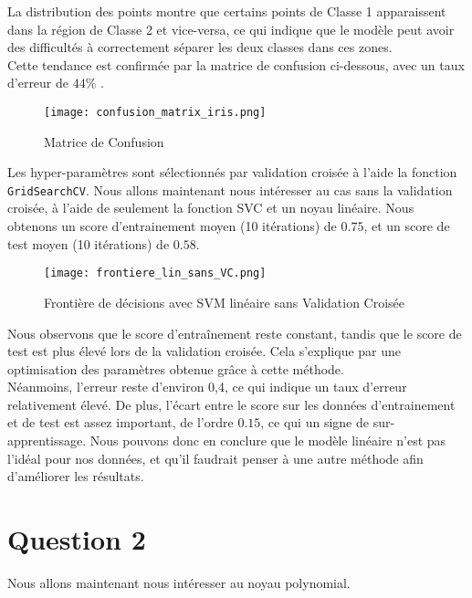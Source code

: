 \documentclass{article}
\begin{document}
La distribution des points montre que certains points de Classe 1 apparaissent dans la région de Classe 2 et vice-versa, ce qui indique que le modèle peut avoir des difficultés à correctement séparer les deux classes dans ces zones.\\


Cette tendance est confirmée par la matrice de confusion ci-dessous, avec un taux d'erreur de $44 \%$ .

\begin{figure}[H]
    \centering
    \texttt{[image: confusion\_matrix\_iris.png]}
    \caption{Matrice de Confusion}
    \label{fig:enter-label}
\end{figure}

Les hyper-paramètres sont sélectionnés par validation croisée à l'aide la fonction \texttt{GridSearchCV}. Nous allons maintenant nous intéresser au cas sans la validation croisée, à l’aide de seulement la fonction SVC et un noyau linéaire. Nous obtenons un score d'entrainement moyen (10 itérations) de $0.75$, et un score de test moyen (10 itérations) de $0.58$.


\begin{figure}[H]
    \centering
    \texttt{[image: frontiere\_lin\_sans\_VC.png]}
    \caption{Frontière de décisions avec SVM linéaire sans Validation Croisée}
    \label{fig:enter-label}
\end{figure}

Nous observons que le score d'entraînement reste constant, tandis que le score de test est plus élevé lors de la validation croisée. Cela s'explique par une optimisation des paramètres obtenue grâce à cette méthode.
\\ 

Néanmoins, l'erreur reste d'environ 0,4, ce qui indique un taux d'erreur relativement élevé. De plus, l'écart entre le score sur les données d'entrainement et de test est assez important, de l'ordre $0.15$, ce qui un signe de sur-apprentissage.
Nous pouvons  donc en conclure que le modèle linéaire n'est pas l'idéal pour nos données, et qu'il faudrait penser à une autre méthode afin d'améliorer les résultats.



\pagebreak


\section{Question 2}

Nous allons maintenant nous intéresser au noyau polynomial. \\
\end{document}
